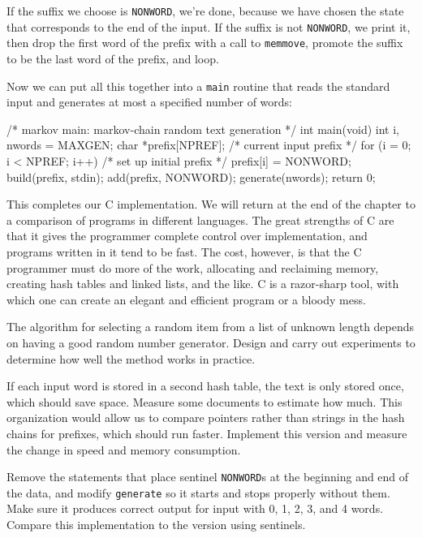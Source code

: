 If the suffix we choose is \verb'NONWORD', we're done, because we have
chosen the state that corresponds to the end of the input. If the suffix is
not \verb'NONWORD', we print it, then drop the first word of the prefix
with a call to \verb'memmove', promote the suffix to be the last word of
the prefix, and loop.

Now we can put all this together into a \verb'main' routine that reads the
standard input and generates at most a specified number of words:
\begin{wellcode}
    /* markov main: markov-chain random text generation */
    int main(void)
    {
        int i, nwords = MAXGEN;
        char    *prefix[NPREF];     /* current input prefix */
        for (i = 0; i < NPREF; i++) /* set up initial prefix */
            prefix[i] = NONWORD;
        build(prefix, stdin);
        add(prefix, NONWORD);
        generate(nwords);
        return 0;
    }
\end{wellcode}

This completes our C implementation. We will return at the end of the
chapter to a comparison of programs in different languages. The great
strengths of C are that it gives the programmer complete control over
implementation, and programs written in it tend to be fast. The cost,
however, is that the C programmer must do more of the work, allocating and
reclaiming memory, creating hash tables and linked lists, and the like. C
is a razor-sharp tool, with which one can create an elegant and efficient
program or a bloody mess.

\begin{exercise}
    The algorithm for selecting a random item from a list of unknown length
    depends on having a good random number generator. Design and carry out
    experiments to determine how well the method works in practice.
\end{exercise}

\begin{exercise}
    If each input word is stored in a second hash table, the text is only
    stored once, which should save space. Measure some documents to
    estimate how much. This organization would allow us to compare pointers
    rather than strings in the hash chains for prefixes, which should run
    faster. Implement this version and measure the change in speed and
    memory consumption.
\end{exercise}

\begin{exercise}
    Remove the statements that place sentinel \verb'NONWORD's at the
    beginning and end of the data, and modify \verb'generate' so it starts
    and stops properly without them. Make sure it produces correct output
    for input with 0, 1, 2, 3, and 4 words.  Compare this implementation to
    the version using sentinels.
\end{exercise}
